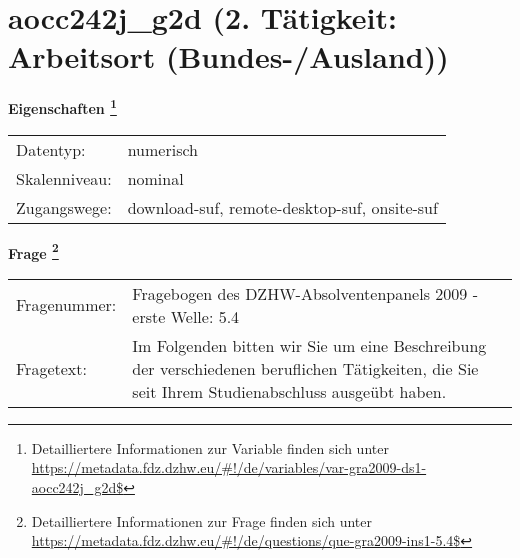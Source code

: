 
    \setcounter{footnote}{0}

    \vspace*{-1.8cm}
	\section{aocc242j\_g2d (2. Tätigkeit: Arbeitsort (Bundes-/Ausland))}
	\label{section:aocc242j_g2d}



    \vspace*{0.5cm}
    \noindent\textbf{Eigenschaften
	\footnote{Detailliertere Informationen zur Variable finden sich unter
		\url{https://metadata.fdz.dzhw.eu/\#!/de/variables/var-gra2009-ds1-aocc242j_g2d$}}}\\
	\begin{tabularx}{\hsize}{@{}lX}
	Datentyp: & numerisch \\
	Skalenniveau: & nominal \\
	Zugangswege: &
	  download-suf, 
	  remote-desktop-suf, 
	  onsite-suf
 \\
    \end{tabularx}



				\vspace*{0.5cm}
                \noindent\textbf{Frage
	                \footnote{Detailliertere Informationen zur Frage finden sich unter
		              \url{https://metadata.fdz.dzhw.eu/\#!/de/questions/que-gra2009-ins1-5.4$}}}\\
				\begin{tabularx}{\hsize}{@{}lX}
					Fragenummer: &
					  Fragebogen des DZHW-Absolventenpanels 2009 - erste Welle:
					  5.4
 \\
					Fragetext: & Im Folgenden bitten wir Sie um eine Beschreibung der verschiedenen beruflichen Tätigkeiten, die Sie seit Ihrem Studienabschluss ausgeübt haben. \\
				\end{tabularx}





